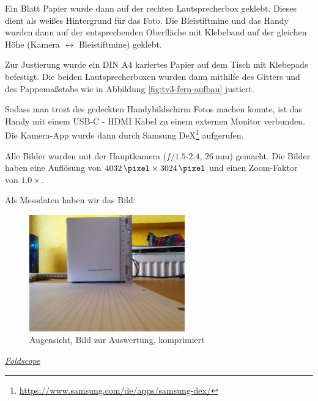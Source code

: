 			Ein Blatt Papier wurde dann auf der rechten Lautsprecherbox geklebt. Dieses dient als weißes Hintergrund für das Foto. Die Bleistiftmine und das Handy wurden dann auf der entsprechenden Oberfläche mit Klebeband auf der gleichen Höhe (Kamera $\leftrightarrow$ Bleistiftmine) geklebt. 

			Zur Justierung wurde ein DIN A4 kariertes Papier auf dem Tisch mit Klebepads befestigt. Die beiden Lautsprecherboxen wurden dann mithilfe des Gitters und des Pappemaßstabs wie in Abbildung \ref{fig:tv3-fern-aufbau} justiert. 

			Sodass man trozt des gedeckten Handybildschirm Fotos machen konnte, ist das Handy mit einem USB-C - HDMI Kabel zu einem externen Monitor verbunden. Die Kamera-App wurde dann durch Samsung DeX\footnote{\url{https://www.samsung.com/de/apps/samsung-dex/}} aufgerufen. 

			Alle Bilder wurden mit der Hauptkamera ($f/1.5$-$2.4$, $\SI{26}{\milli\meter}$) gemacht. Die Bilder haben eine Auflösung von $\SI{4032}{\pixel} \times \SI{3024}{\pixel}$ und einen Zoom-Faktor von $\num{1.0}\times$.

			Als Messdaten haben wir das Bild:
			\begin{figure}[H]
				\centering
				\includegraphics[width=0.6\textwidth,angle=180,origin=c]{images/tv3/eye.jpg}
				\caption{Augensicht, Bild zur Auswertung, komprimiert}
				\label{fig:tv3-data-eye}
				\vspace{-10pt}
			\end{figure}
		\underline{\large\textit{Foldscope}}
		\vspace{0.5\baselineskip}

